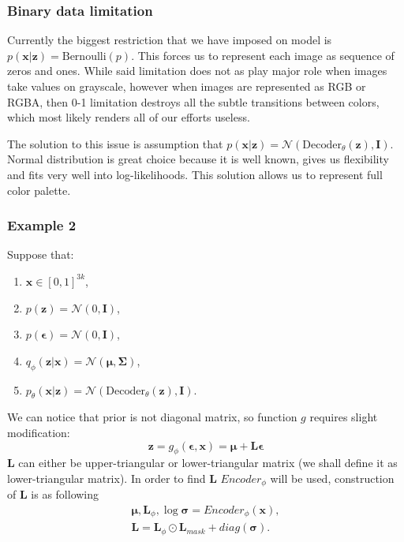 \documentclass[10pt]{article}
\begin{document}
\subsubsection{Binary data limitation}
Currently the biggest restriction that we have imposed on model is $p(\textbf{x} | \textbf{z}) = \text{Bernoulli}(p)$. This forces us to represent each image as sequence of zeros and ones. While said limitation does not as play major role when images take values on grayscale, however when images are represented as RGB or RGBA, then 0-1 limitation destroys all the subtle transitions between colors, which most likely renders all of our efforts useless. 

The solution to this issue is assumption that $p(\textbf{x} | \textbf{z}) = \mathcal{N}(\text{Decoder}_{\theta}( \textbf{z}), \mathbf{I} )$. Normal distribution is great choice because it is well known, gives us flexibility and fits very well into log-likelihoods. This solution allows us to represent full color palette.
\subsubsection{Example 2}
Suppose that:
\begin{enumerate}
    \item $\textbf{x} \in [0,1]^{3k}$,
    \item $p(\textbf{z}) = \mathcal{N}(0, \mathbf{I} )$,
    \item $p(\bm{\epsilon}) = \mathcal{N}(0, \mathbf{I} )$, 
    \item $ q_{\phi }(\textbf{z}|\textbf{x}) = 
    \mathcal{N}(\bm{\mu}, \bm{\Sigma} )$,
    \item $p_{\theta}(\textbf{x} | \textbf{z}) = 
    \mathcal{N}(\text{Decoder}_{\theta}( \textbf{z}), \mathbf{I} )$. 
\end{enumerate}
We can notice that prior is not diagonal matrix, so function $g$ requires slight modification:
\begin{equation}
        \textbf{z} = g_{\phi} (\bm{\epsilon}, \textbf{x}) = \bm{\mu} + \textbf{L}\bm{\epsilon}
\end{equation}
$\textbf{L}$ can either be upper-triangular or lower-triangular matrix (we shall define it as lower-triangular matrix).
In order to find  $\textbf{L}$ $Encoder_{\phi}$ will be used, construction of  $\textbf{L}$ is as following
\begin{gather}
    \bm{\mu}, \textbf{L}_{\phi} , \log \bm \sigma = Encoder_{\phi}(\textbf{x}), \\ 
    \textbf{L} = \textbf{L}_{\phi} \odot \textbf{L}_{mask} + diag(\bm \sigma).
\end{gather}
\end{document}
